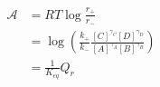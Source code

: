 \begin{eqnarray}\label{eqn:reaction-affinity-ratio}
\mathcal A &= RT\log\frac{r_+}{r_-} \\
& = \log\left(\frac{k_+}{k_-}\frac{[C]^{\gamma_C}[D]^{\gamma_D}}{[A]^{\gamma_A}[B]^{\gamma_B}}\right) \\
& = \frac{1}{K_{eq}}{Q_r} \\
\end{eqnarray}